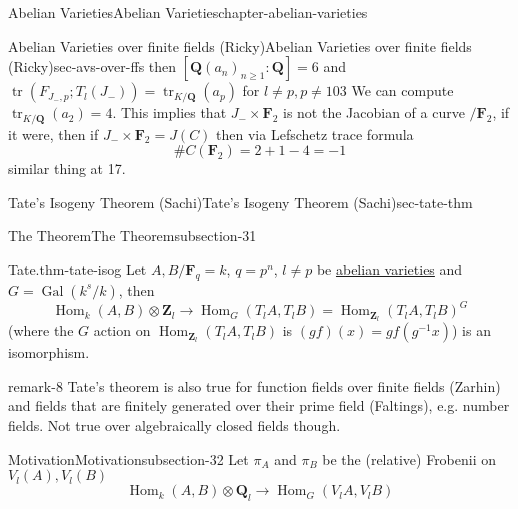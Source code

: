 \documentclass[oneside,10pt,]{book}
\numberwithin{equation}{section}
\newcommand{\lb}{[}
\newcommand{\rb}{]}
\newcommand{\ZZ}{\mathbf{Z}}
\newcommand{\QQ}{\mathbf{Q}}
\newcommand{\FF}{\mathbf{F}}
\DeclareMathOperator{\Hom}{Hom}
\DeclareMathOperator{\tr}{tr}
\newcommand{\Gal}[2]{\operatorname{Gal}(#1/#2)}
\begin{document}
\begin{chapterptx}{Abelian Varieties}{}{Abelian Varieties}{}{}{chapter-abelian-varieties}
\begin{sectionptx}{Abelian Varieties over finite fields (Ricky)}{}{Abelian Varieties over finite fields (Ricky)}{}{}{sec-avs-over-ffs}
then \(\lb \QQ(a_n)_{n \ge 1}: \QQ\rb =6\) and \(\tr( F_{J_-,p};  T_l(J_-)) = \tr_{K/\QQ}(a_p)\)  for \(l \ne p, p\ne 103\) We can compute \(\tr_{K/\QQ} ( a_2) = 4\). This implies that \(J_- \times \FF_2\) is not the Jacobian of a curve \(/\FF_2\), if it were, then  if \(J_- \times \FF_2 = J(C)\) then via Lefschetz trace formula%
\begin{equation*}
\#C(\FF_2) = 2+1 - 4 = -1
\end{equation*}
similar thing at 17.%
\end{sectionptx}
%
%
\typeout{************************************************}
\typeout{************************************************}
%
\begin{sectionptx}{Tate's Isogeny Theorem (Sachi)}{}{Tate's Isogeny Theorem (Sachi)}{}{}{sec-tate-thm}
%
%
\typeout{************************************************}
\typeout{************************************************}
%
\begin{subsectionptx}{The Theorem}{}{The Theorem}{}{}{subsection-31}
\begin{theorem}{Tate.}{}{thm-tate-isog}%
\hypertarget{p-376}{}%
Let \(A,B/\FF_q = k\), \(q = p^n\), \(l\ne p\) be \hyperref[def-buntes-abvar]{abelian varieties} and \(G = \Gal{k^s}{k}\), then%
\begin{equation*}
\Hom_{k}(A,B)\otimes \ZZ_l \to \Hom_G(T_l A, T_lB) = \Hom_{\ZZ_l}(T_lA,T_lB)^G
\end{equation*}
(where the \(G\) action on \(\Hom_{\ZZ_l}(T_l A, T_lB)\) is \((gf)(x) = gf(g^{-1}x)\)) is an isomorphism.%
\end{theorem}
\begin{remark}{}{remark-8}%
\hypertarget{p-377}{}%
Tate's theorem is also true for function fields over finite fields (Zarhin) and fields that are finitely generated over their prime field (Faltings), e.g. number fields. Not true over algebraically closed fields though.%
\end{remark}
\end{subsectionptx}
%
%
\typeout{************************************************}
\typeout{************************************************}
%
\begin{subsectionptx}{Motivation}{}{Motivation}{}{}{subsection-32}
\hypertarget{p-378}{}%
Let \(\pi_A\) and \(\pi_B\) be the (relative) Frobenii on \(V_l(A), V_l(B)\)%
\begin{equation*}
\Hom_{k}(A,B)\otimes \QQ_l \to \Hom_G(V_l A, V_lB)

\end{equation*}
\end{subsectionptx}
\end{sectionptx}
\end{chapterptx}
\end{document}
